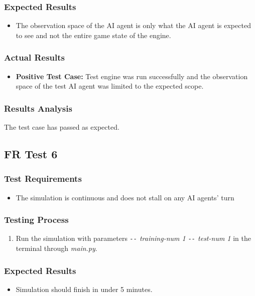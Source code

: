 \documentclass[12pt, titlepage]{article}
\begin{document}
\subsubsection{Expected Results}
\begin{itemize}
    \item The observation space of the AI agent is only what the AI agent is expected to see and not the entire game state of the engine. 
\end{itemize}
\subsubsection{Actual Results}
\begin{itemize}
    \item \textbf{Positive Test Case:} Test engine was run successfully and the observation space of the test AI agent was limited to the expected scope.
\end{itemize}
\subsubsection{Results Analysis}
The test case has passed as expected.

\subsection{FR Test 6}
\subsubsection{Test Requirements}
\begin{itemize}
    \item The simulation is continuous and does not stall on any AI agents' turn
\end{itemize}
\subsubsection{Testing Process}
\begin{enumerate}
    \item Run the simulation with parameters \textit{\texttt{-{}-}
training-num 1 \texttt{-{}-}
test-num 1} in the terminal through \textit{main.py}.
\end{enumerate}
\subsubsection{Expected Results}
\begin{itemize}
    \item Simulation should finish in under 5 minutes.
\end{itemize}
\end{document}
